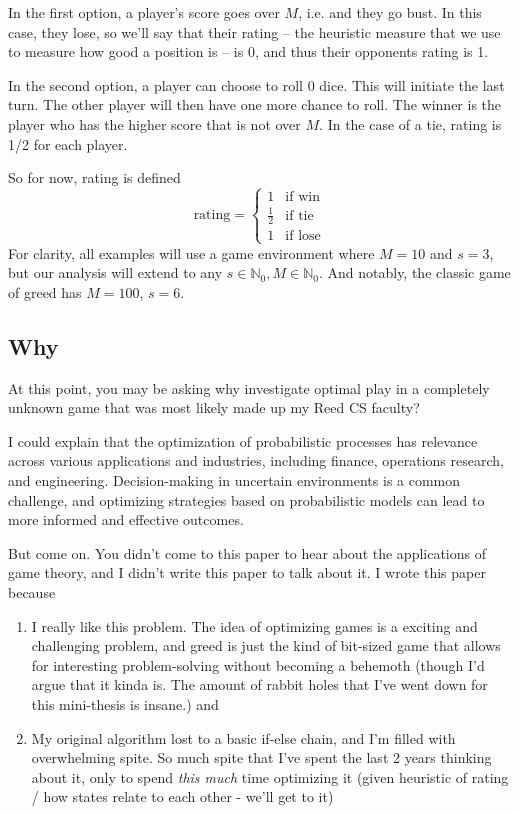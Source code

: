 \documentclass[a4paper]{article}
\begin{document}
In the first option, a player's score goes over $M$, i.e. and they go bust. In this case, they lose, so we'll say that their rating -- the heuristic measure that we use to measure how good a position is -- is 0, and thus their opponents rating is 1. 

In the second option, a player can choose to roll 0 dice. This will initiate the last turn. The other player will then have one more chance to roll. The winner is the player who has the higher score that is not over $M$. In the case of a tie, rating is 1/2 for each player. 

So for now, rating is defined
%
$$
\text{rating} = \begin{cases}
	1 & \text{if win} \\
	\frac{1}{2} & \text{if tie} \\
	1 & \text{if lose} 
\end{cases}
$$
%
For clarity, all examples will use a game environment where $M = 10$ and $s = 3$, but our analysis will extend to any $s \in \mathbb{N}_0, M \in \mathbb{N}_0$. And notably, the classic game of greed has $M = 100$, $s = 6$.


\subsection{Why}

At this point, you may be asking why investigate optimal play in a completely unknown game that was most likely made up my Reed CS faculty? 

I could explain that the optimization of probabilistic processes has relevance across various applications and industries, including finance, operations research, and engineering. Decision-making in uncertain environments is a common challenge, and optimizing strategies based on probabilistic models can lead to more informed and effective outcomes.

But come on. You didn't come to this paper to hear about the applications of game theory, and I didn't write this paper to talk about it. I wrote this paper because 

\begin{enumerate}
\item I really like this problem. The idea of optimizing games is a exciting and challenging problem, and greed is just the kind of bit-sized game that allows for interesting problem-solving without becoming a behemoth (though I'd argue that it kinda is. The amount of rabbit holes that I've went down for this mini-thesis is insane.) and

\item My original algorithm lost to a basic if-else chain, and I'm filled with overwhelming spite. So much spite that I've spent the last 2 years thinking about it, only to spend \textit{this much} time optimizing it (given heuristic of rating / how states relate to each other - we'll get to it) 
\end{enumerate}
\end{document}
